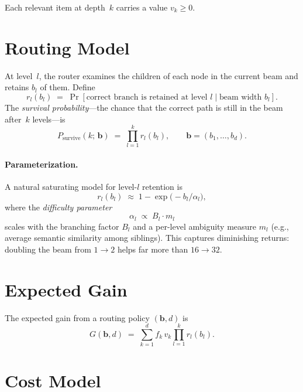 \documentclass[11pt]{article}
\newcommand{\bvec}{\mathbf{b}}
\theoremstyle{plain}
\begin{document}
Each relevant item at depth~$k$ carries a value $v_k \geq 0$.

\section{Routing Model}

At level~$l$, the router examines the children of each node in the
current beam and retains $b_l$ of them.  Define
\[
  r_l(b_l) \;=\; \Pr[\text{correct branch is retained at level } l
    \mid \text{beam width } b_l].
\]
The \emph{survival probability}---the chance that the correct path is
still in the beam after~$k$ levels---is
\[
  P_{\mathrm{survive}}(k;\, \bvec)
  \;=\; \prod_{l=1}^{k} r_l(b_l),
  \qquad \bvec = (b_1, \ldots, b_d).
\]

\paragraph{Parameterization.}
A natural saturating model for level-$l$ retention is
\begin{equation}\label{eq:retention}
  r_l(b_l) \;\approx\; 1 - \exp\!\bigl(-b_l / \alpha_l\bigr),
\end{equation}
where the \emph{difficulty parameter}
\[
  \alpha_l \;\propto\; B_l \cdot m_l
\]
scales with the branching factor $B_l$ and a per-level
ambiguity measure $m_l$ (e.g., average semantic similarity among
siblings).  This captures diminishing returns: doubling the beam from
$1 \to 2$ helps far more than $16 \to 32$.

\section{Expected Gain}

The expected gain from a routing policy $(\bvec, d)$ is
\begin{equation}\label{eq:gain}
  G(\bvec, d)
  \;=\; \sum_{k=1}^{d} f_k \, v_k \prod_{l=1}^{k} r_l(b_l).
\end{equation}

\section{Cost Model}
\end{document}

